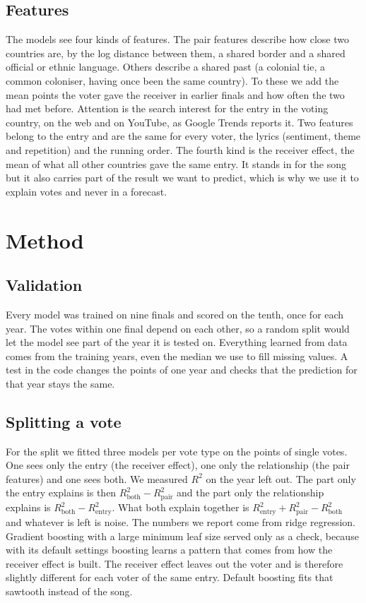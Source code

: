\documentclass[a4paper,10pt]{article}
\begin{document}
\subsection{Features}

The models see four kinds of features.
The pair features describe how close two countries are, by the log distance between them, a shared border and a shared official or ethnic language.
Others describe a shared past (a colonial tie, a common coloniser, having once been the same country).
To these we add the mean points the voter gave the receiver in earlier finals and how often the two had met before.
Attention is the search interest for the entry in the voting country, on the web and on YouTube, as Google Trends reports it.
Two features belong to the entry and are the same for every voter, the lyrics (sentiment, theme and repetition) and the running order.
The fourth kind is the receiver effect, the mean of what all other countries gave the same entry.
It stands in for the song but it also carries part of the result we want to predict, which is why we use it to explain votes and never in a forecast.

\section{Method}

\subsection{Validation}

Every model was trained on nine finals and scored on the tenth, once for each year.
The votes within one final depend on each other, so a random split would let the model see part of the year it is tested on.
Everything learned from data comes from the training years, even the median we use to fill missing values.
A test in the code changes the points of one year and checks that the prediction for that year stays the same.

\subsection{Splitting a vote}

For the split we fitted three models per vote type on the points of single votes.
One sees only the entry (the receiver effect), one only the relationship (the pair features) and one sees both.
We measured $R^2$ on the year left out.
The part only the entry explains is then $R^2_{\text{both}}-R^2_{\text{pair}}$ and the part only the relationship explains is $R^2_{\text{both}}-R^2_{\text{entry}}$.
What both explain together is $R^2_{\text{entry}}+R^2_{\text{pair}}-R^2_{\text{both}}$ and whatever is left is noise.
The numbers we report come from ridge regression.
Gradient boosting with a large minimum leaf size served only as a check, because with its default settings boosting learns a pattern that comes from how the receiver effect is built.
The receiver effect leaves out the voter and is therefore slightly different for each voter of the same entry.
Default boosting fits that sawtooth instead of the song.
\end{document}
